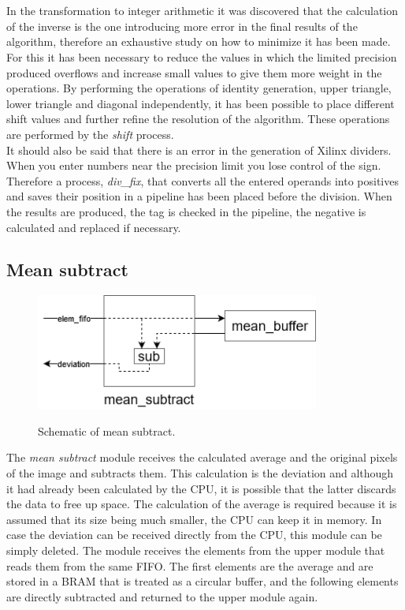 \\
\\
In the transformation to integer arithmetic it was discovered that the calculation of the inverse is the one introducing more error in the final results of the algorithm, therefore an exhaustive study on how to minimize it has been made. For this it has been necessary to reduce the values in which the limited precision produced overflows and increase small values to give them more weight in the operations. By performing the operations of identity generation, upper triangle, lower triangle and diagonal independently, it has been possible to place different shift values and further refine the resolution of the algorithm. These operations are performed by the \textit{shift} process.
\\
It should also be said that there is an error in the generation of Xilinx dividers. When you enter numbers near the precision limit you lose control of the sign. Therefore a process, \textit{div\_fix}, that converts all the entered operands into positives and saves their position in a pipeline has been placed before the division. When the results are produced, the tag is checked in the pipeline, the negative is calculated and replaced if necessary.

\subsection{Mean subtract}

\begin{figure}[h!]
\centering\textbf{
\includegraphics[height=1.5in]{figures/subtract.png}}
\caption{Schematic of mean subtract.}
  \label{fig:subtract}
\end{figure}
The \textit{mean subtract} module receives the calculated average and the original pixels of the image and subtracts them. This calculation is the deviation and although it had already been calculated by the CPU, it is possible that the latter discards the data to free up space. The calculation of the average is required because it is assumed that its size being much smaller, the CPU can keep it in memory. In case the deviation can be received directly from the CPU, this module can be simply deleted.
The module receives the elements from the upper module that reads them from the same FIFO. The first elements are the average and are stored in a BRAM that is treated as a circular buffer, and the following elements are directly subtracted and returned to the upper module again.


